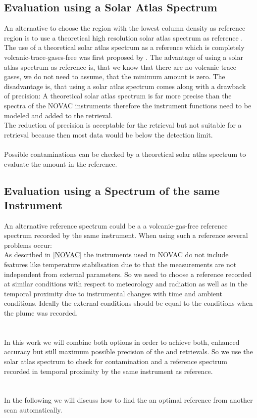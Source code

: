 \documentclass  [
  paper    = a4,
  BCOR     = 10mm,
  twoside,
  fontsize = 12pt,
  fleqn,
  toc      = bibnumbered,
  toc      = listofnumbered,
  numbers  = noendperiod,
  headings = normal,
  listof   = leveldown,
  version  = 3.03
]                                       {scrreprt}
\begin{document}
	\subsection*{Evaluation using a Solar Atlas Spectrum \label{kuruz}}
	An alternative to choose the region with the lowest column density as reference region is to use a theoretical high resolution solar atlas spectrum as reference \cite{chance2010improved}.
	The use of a theoretical solar atlas spectrum as a reference which is completely volcanic-trace-gases-free was first proposed by \cite{lubcke2014bro}.
	The advantage of using a solar atlas spectrum as reference is, that we know that there are no volcanic trace gases, we do not need to assume, that the minimum  amount is zero. The disadvantage is, that using a solar atlas spectrum comes along with a drawback of precision: A theoretical solar atlas spectrum is far more precise than the spectra of the NOVAC instruments therefore the instrument functions need to be modeled and added to the retrieval.\\ 
	The reduction of precision is acceptable for the
	 retrieval but not suitable for a  retrieval because then most data would be below the detection limit.\\
%
\\
%
	Possible contaminations can be checked
	by a theoretical solar atlas spectrum to evaluate the  amount in the reference.
	\subsection*{Evaluation using a Spectrum of the same Instrument}
	An alternative reference spectrum could be a a volcanic-gas-free reference
	spectrum recorded by the same instrument. When using such a reference several problems occur:\\
	As described in \cref{NOVAC} the instruments used in NOVAC do not include features like temperature stabilisation due to that the measurements are not independent from external parameters. 
	So we need to choose a reference recorded at similar conditions with respect to meteorology and	radiation as well as in the temporal proximity due to instrumental changes with time and ambient conditions. Ideally the external conditions should be equal to the conditions when the plume was recorded.\\
	\\
	\\
	In this work we will combine both options in order to
	achieve both, enhanced accuracy but still maximum possible precision of
	the  and  retrievals. So we use the solar atlas spectrum to check for 
	contamination and a reference spectrum recorded in temporal proximity by the same instrument as reference.\\
	\\
	\\
	In the following we will discuss how to find the an optimal reference from another scan automatically.
	
\end{document}
